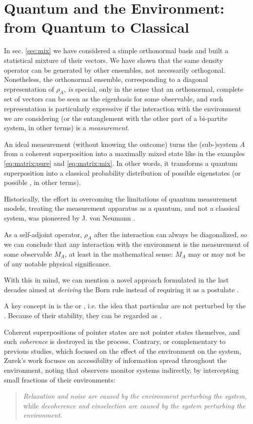 \section{Quantum and the Environment: from Quantum to Classical}
\label{sec:q2c}

In sec. \ref{sec:mix} we have considered a simple orthonormal basis
and built a statistical mixture of their vectors. We have shown
that the same density operator can be generated by other ensembles,
not necessarily orthogonal. Nonetheless, the orthonormal ensemble,
corresponding to a diagonal representation of $\rho_A$, \emph{is}
special, only in the sense that an orthonormal, complete set of
vectors can be seen as the eigenbasis for some observable,
and such representation is particularly expressive if the
interaction with the environment we are considering
(or the entanglement with the other part of a bi-partite system, in other terms)
is a \emph{measurement}.

An ideal measurement (without knowing the outcome) turns
the (sub-)system $A$ from a coherent superposition into a
maximally mixed state like in the examples
\eqref{eq:matrix:pure} and \eqref{eq:matrix:mix}.
In other words, it transforms a quantum superposition into a classical probability
distribution of possible eigenstates (or possible , in other terms).

Historically,
the effort in overcoming the limitations of quantum measurement models,
treating the measurement apparatus as a quantum,
and not a classical system,
was pioneered by J. von Neumann \parencite{VonNeumann}.

As a self-adjoint operator, $\rho_A$ after the interaction
can always be diagonalized, so we can conclude that any
interaction with the environment is the measurement of some
observable $M_A$, at least in the mathematical sense: $M_A$ may or
may not be of any notable physical significance.

With this in mind, we can mention
a novel approach formulated in the last decades aimed at
\emph{deriving}
the Born rule
instead of requiring it as a postulate
\parencite{Zurek_Einselect}.

A key concept in \cite{Zurek_Einselect} is the
 or ,
i.e. the idea that particular  are not
perturbed by the .
Because of their stability, they can be regarded as
.

Coherent superpositions of pointer states are not pointer states
themelves, and such \emph{coherence} is destroyed in the process. 
Contrary,
or complementary to previous studies, which focused on the effect of
the environment on the system, Zurek's work
focuses on
accessibility of information spread throughout the environment,
noting that observers monitor systems indirectly, by intercepting
small fractions of their environments:
\begin{quote}
\emph{Relaxation and noise are caused by the environment perturbing
the system}, while \emph{decoherence and einselection
are caused by the system perturbing the environment}.
\end{quote}

